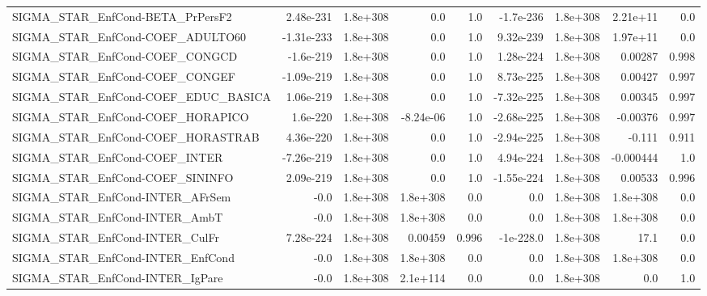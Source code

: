 \begin{tabular}{lrrrrrrrr}
SIGMA\_STAR\_EnfCond-BETA\_PrPersF2      &   2.48e-231 &     1.8e+308 &        0.0 &      1.0 &  -1.7e-236 &    1.8e+308 &     2.21e+11 &           0.0 \\
SIGMA\_STAR\_EnfCond-COEF\_ADULTO60      &  -1.31e-233 &     1.8e+308 &        0.0 &      1.0 &  9.32e-239 &    1.8e+308 &     1.97e+11 &           0.0 \\
SIGMA\_STAR\_EnfCond-COEF\_CONGCD        &   -1.6e-219 &     1.8e+308 &        0.0 &      1.0 &  1.28e-224 &    1.8e+308 &      0.00287 &         0.998 \\
SIGMA\_STAR\_EnfCond-COEF\_CONGEF        &  -1.09e-219 &     1.8e+308 &        0.0 &      1.0 &  8.73e-225 &    1.8e+308 &      0.00427 &         0.997 \\
SIGMA\_STAR\_EnfCond-COEF\_EDUC\_BASICA   &   1.06e-219 &     1.8e+308 &        0.0 &      1.0 & -7.32e-225 &    1.8e+308 &      0.00345 &         0.997 \\
SIGMA\_STAR\_EnfCond-COEF\_HORAPICO      &    1.6e-220 &     1.8e+308 &  -8.24e-06 &      1.0 & -2.68e-225 &    1.8e+308 &     -0.00376 &         0.997 \\
SIGMA\_STAR\_EnfCond-COEF\_HORASTRAB     &   4.36e-220 &     1.8e+308 &        0.0 &      1.0 & -2.94e-225 &    1.8e+308 &       -0.111 &         0.911 \\
SIGMA\_STAR\_EnfCond-COEF\_INTER         &  -7.26e-219 &     1.8e+308 &        0.0 &      1.0 &  4.94e-224 &    1.8e+308 &    -0.000444 &           1.0 \\
SIGMA\_STAR\_EnfCond-COEF\_SININFO       &   2.09e-219 &     1.8e+308 &        0.0 &      1.0 & -1.55e-224 &    1.8e+308 &      0.00533 &         0.996 \\
SIGMA\_STAR\_EnfCond-INTER\_AFrSem       &        -0.0 &     1.8e+308 &   1.8e+308 &      0.0 &        0.0 &    1.8e+308 &     1.8e+308 &           0.0 \\
SIGMA\_STAR\_EnfCond-INTER\_AmbT         &        -0.0 &     1.8e+308 &   1.8e+308 &      0.0 &        0.0 &    1.8e+308 &     1.8e+308 &           0.0 \\
SIGMA\_STAR\_EnfCond-INTER\_CulFr        &   7.28e-224 &     1.8e+308 &    0.00459 &    0.996 &  -1e-228.0 &    1.8e+308 &         17.1 &           0.0 \\
SIGMA\_STAR\_EnfCond-INTER\_EnfCond      &        -0.0 &     1.8e+308 &   1.8e+308 &      0.0 &        0.0 &    1.8e+308 &     1.8e+308 &           0.0 \\
SIGMA\_STAR\_EnfCond-INTER\_IgPare       &        -0.0 &     1.8e+308 &   2.1e+114 &      0.0 &        0.0 &    1.8e+308 &          0.0 &           1.0 \\

\end{tabular}
